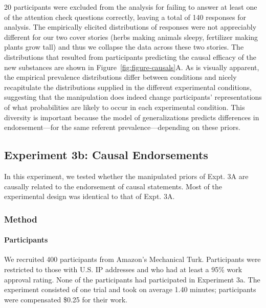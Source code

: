 \documentclass[english,,man,floatsintext]{apa6}
\let\oldparagraph\paragraph
\renewcommand{\paragraph}[1]{\oldparagraph{#1}\mbox{}}
\theoremstyle{definition}
\theoremstyle{definition}
\theoremstyle{definition}
\theoremstyle{remark}
\begin{document}
20 participants were excluded from the analysis for failing to answer at
least one of the attention check questions correctly, leaving a total of
140 responses for analysis. The empirically elicited distributions of
responses were not appreciably different for our two cover stories
(herbs making animals sleepy, fertilizer making plants grow tall) and
thus we collapse the data across these two stories. The distributions
that resulted from participants predicting the causal efficacy of the
new substances are shown in Figure~\ref{fig:figure-causals}A. As is
visually apparent, the empirical prevalence distributions differ between
conditions and nicely recapitulate the distributions supplied in the
different experimental conditions, suggesting that the manipulation does
indeed change participants' representations of what probabilities are
likely to occur in each experimental condition. This diversity is
important because the model of generalizations predicts differences in
endorsement---for the same referent prevalence---depending on these
priors.

\hypertarget{experiment-3b-causal-endorsements}{%
\subsection{Experiment 3b: Causal
Endorsements}\label{experiment-3b-causal-endorsements}}

In this experiment, we tested whether the manipulated priors of Expt. 3A
are causally related to the endorsement of causal statements. Most of
the experimental design was identical to that of Expt. 3A.

\hypertarget{method-6}{%
\subsubsection{Method}\label{method-6}}

\hypertarget{participants-6}{%
\paragraph{Participants}\label{participants-6}}

We recruited 400 participants from Amazon's Mechanical Turk.
Participants were restricted to those with U.S. IP addresses and who had
at least a 95\% work approval rating. None of the participants had
participated in Experiment 3a. The experiment consisted of one trial and
took on average 1.40 minutes; participants were compensated \$0.25 for
their work.
\end{document}

